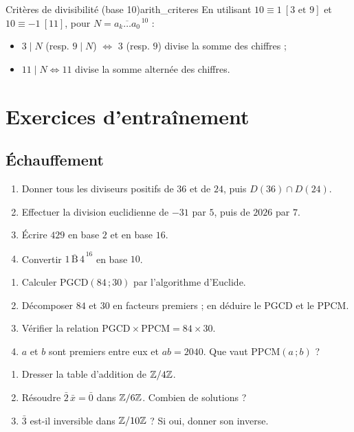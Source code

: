 \begin{propriete}{Critères de divisibilité (base 10)}{arith_criteres}
	En utilisant $10 \equiv 1\ [3\text{ et }9]$ et $10 \equiv -1\ [11]$, pour
	$N = \overline{a_k \ldots a_0}^{\,10}$ :
	\begin{itemize}[label=\textbullet]
		\item $3 \mid N$ (resp. $9 \mid N$) $\iff$ $3$ (resp. $9$) divise la
		somme des chiffres ;
		\item $11 \mid N \iff 11$ divise la somme alternée des chiffres.
	\end{itemize}
\end{propriete}


\section{Exercices d'entraînement}

\subsection{Échauffement}

\begin{enumerate}
	\item Donner tous les diviseurs positifs de $36$ et de $24$, puis $D(36) \cap D(24)$.
	\item Effectuer la division euclidienne de $-31$ par $5$, puis de $2026$
	par $7$.
	\item Écrire $429$ en base $2$ et en base $16$.
	\item Convertir $\overline{1\,\mathrm{B}\,4}^{\,16}$ en base $10$.
\end{enumerate}

\begin{enumerate}
	\item Calculer $\mathrm{PGCD}(84\,;30)$ par l'algorithme d'Euclide.
	\item Décomposer $84$ et $30$ en facteurs premiers ; en déduire le PGCD et
	le PPCM.
	\item Vérifier la relation $\mathrm{PGCD}\times\mathrm{PPCM} = 84\times30$.
	\item $a$ et $b$ sont premiers entre eux et $ab = 2040$. Que vaut
	$\mathrm{PPCM}(a\,;b)$ ?
\end{enumerate}

\begin{enumerate}
	\item Dresser la table d'addition de $\mathbb{Z}/4\mathbb{Z}$.
	\item Résoudre $\bar 2\,\bar x = \bar 0$ dans $\mathbb{Z}/6\mathbb{Z}$. Combien de solutions ?
	\item $\bar 3$ est-il inversible dans $\mathbb{Z}/10\mathbb{Z}$ ? Si oui, donner son inverse.
\end{enumerate}

